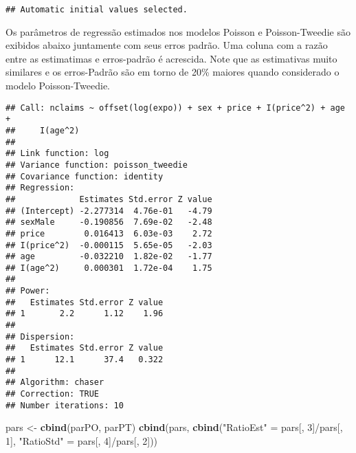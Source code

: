 \documentclass[9pt,a5paper,]{book}
\newenvironment{Shaded}{}{}
\newcommand{\KeywordTok}[1]{\textbf{{#1}}}
\newcommand{\DecValTok}[1]{{#1}}
\newcommand{\StringTok}[1]{{#1}}
\newcommand{\NormalTok}[1]{{#1}}
\renewenvironment{Shaded}{\color{inputcolor}}{}
\theoremstyle{definition}
\theoremstyle{definition}
\theoremstyle{remark}
\begin{document}
\begin{verbatim}
## Automatic initial values selected.
\end{verbatim}

Os parâmetros de regressão estimados nos modelos Poisson e
Poisson-Tweedie são exibidos abaixo juntamente com seus erros padrão.
Uma coluna com a razão entre as estimatimas e erros-padrão é acrescida.
Note que as estimativas muito similares e os erros-Padrão são em torno
de 20\% maiores quando considerado o modelo Poisson-Tweedie.

\begin{Shaded}
\end{Shaded}

\begin{verbatim}
## Call: nclaims ~ offset(log(expo)) + sex + price + I(price^2) + age + 
##     I(age^2)
## 
## Link function: log
## Variance function: poisson_tweedie
## Covariance function: identity
## Regression:
##             Estimates Std.error Z value
## (Intercept) -2.277314  4.76e-01   -4.79
## sexMale     -0.190856  7.69e-02   -2.48
## price        0.016413  6.03e-03    2.72
## I(price^2)  -0.000115  5.65e-05   -2.03
## age         -0.032210  1.82e-02   -1.77
## I(age^2)     0.000301  1.72e-04    1.75
## 
## Power:
##   Estimates Std.error Z value
## 1       2.2      1.12    1.96
## 
## Dispersion:
##   Estimates Std.error Z value
## 1      12.1      37.4   0.322
## 
## Algorithm: chaser
## Correction: TRUE
## Number iterations: 10
\end{verbatim}

\begin{Shaded}
\begin{Highlighting}[]
\NormalTok{pars <-}\StringTok{ }\KeywordTok{cbind}\NormalTok{(parPO, parPT)}
\KeywordTok{cbind}\NormalTok{(pars, }\KeywordTok{cbind}\NormalTok{(}\StringTok{"RatioEst"} \NormalTok{=}\StringTok{ }\NormalTok{pars[, }\DecValTok{3}\NormalTok{]/pars[, }\DecValTok{1}\NormalTok{],}
                  \StringTok{"RatioStd"} \NormalTok{=}\StringTok{ }\NormalTok{pars[, }\DecValTok{4}\NormalTok{]/pars[, }\DecValTok{2}\NormalTok{]))}
\end{Highlighting}
\end{Shaded}
\end{document}
